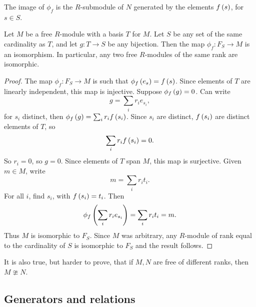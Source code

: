 The image of $ \phi_f $ is the $ R $-submodule of $ N $ generated by the elements $ f\left( s \right) $, for $ s \in S $.

\begin{corollary}
Let $ M $ be a free $ R $-module with a basis $ T $ for $ M $. Let $ S $ be any set of the same cardinality as $ T $, and let $ g : T \to S $ be any bijection. Then the map $ \phi_f : F_S \to M $ is an isomorphism. In particular, any two free $ R $-modules of the same rank are isomorphic.
\end{corollary}

\begin{proof}
The map $ \phi_f : F_S \to M $ is such that $ \phi_f\left( e_s \right) = f\left( s \right) $. Since elements of $ T $ are linearly independent, this map is injective. Suppose $ \phi_f\left( g \right) = 0 $. Can write
$$ g = \sum_i r_ie_{s_i}, $$
for $ s_i $ distinct, then $ \phi_f\left( g \right) = \sum_i r_if\left( s_i \right) $. Since $ s_i $ are distinct, $ f\left( s_i \right) $ are distinct elements of $ T $, so
$$ \sum_i r_if\left( s_i \right) = 0. $$
So $ r_i = 0 $, so $ g = 0 $. Since elements of $ T $ span $ M $, this map is surjective. Given $ m \in M $, write
$$ m = \sum_i r_it_i. $$
For all $ i $, find $ s_i $, with $ f\left( s_i \right) = t_i $. Then
$$ \phi_f\left( \sum_i r_ie_{s_i} \right) = \sum_i r_it_i = m. $$
Thus $ M $ is isomorphic to $ F_S $. Since $ M $ was arbitrary, any $ R $-module of rank equal to the cardinality of $ S $ is isomorphic to $ F_S $ and the result follows.
\end{proof}

\begin{note*}
It is also true, but harder to prove, that if $ M, N $ are free of different ranks, then $ M \ncong N $.
\end{note*}


\subsection{Generators and relations}

